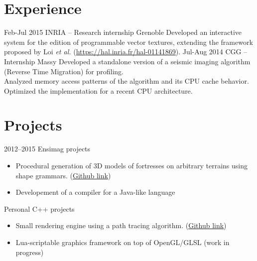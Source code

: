 \documentclass[]{friggeri-cv}
\begin{document}
\section{Experience}

\begin{entrylist}
   \entry
    {Feb-Jul 2015}
    {INRIA – Research internship}
    {Grenoble}
    {
    Developed an interactive system for the edition of programmable vector textures, extending the framework proposed by Loi \emph{et al.} (\href{https://hal.inria.fr/hal-01141869}{https://hal.inria.fr/hal-01141869}).
}
  \entry
    {Jul-Aug 2014}
    {CGG – Internship}
    {Massy}
    {Developed a standalone version of a seismic imaging algorithm (Reverse Time Migration) for profiling.\\
    	Analyzed memory access patterns of the algorithm and its CPU cache behavior. Optimized the implementation for a recent CPU architecture.}
    	
\end{entrylist}

\section{Projects}

\begin{entrylist}
  \entry
    {2012--2015}
    {Ensimag projects}
    {}
    {\vspace{-4mm}\begin{itemize}
    \item Procedural generation of 3D models of fortresses on arbitrary terrains using shape grammars. (\href{https://github.com/ennis/stronghold}{Github link})
    \item Developement of a compiler for a Java-like language
    \end{itemize}}

  \entry
    {}
    {Personal C++ projects}
    {}
    {\vspace{-4mm}\begin{itemize}
\item Small rendering engine using a path tracing algorithm. (\href{https://github.com/ennis/path-tracer}{Github link})
\item Lua-scriptable graphics framework on top of OpenGL/GLSL (work in progress) 
\end{itemize}}

\end{entrylist}
\end{document}
